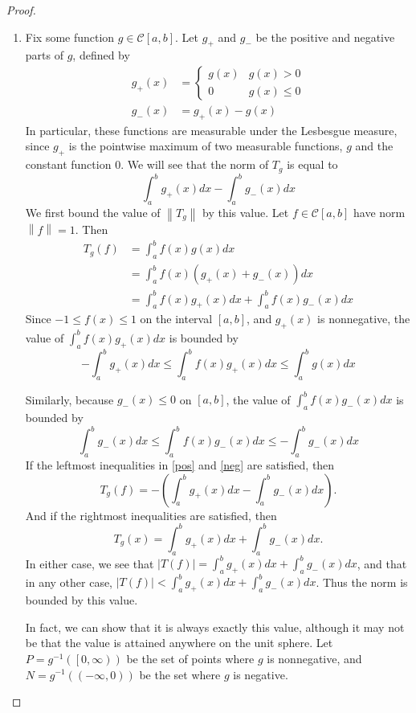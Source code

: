 \documentclass[12pt]{article}
\theoremstyle{definition}
\begin{document}
\begin{proof}
\begin{enumerate}[label=(\roman*)]
		\item Fix some function $g \in \mathcal{C}[a,b]$. Let $g_+$ and $g_-$ be the positive and negative parts of $g$, defined by 
			\begin{align*}g_+(x) &= \begin{cases}
					g(x) & g(x) > 0\\
					0 & g(x) \leq 0
			\end{cases}\\
		g_-(x) &= g_+(x) - g(x)  \end{align*}
		In particular, these functions are measurable under the Lesbesgue measure, since $g_+$ is the pointwise maximum of two measurable functions,  $g$ and the constant function $0$. We will see that the norm of $T_g$ is equal to 
		\[\int_a^b g_+(x) dx - \int_a^b g_-(x) dx\]
		We first bound the value of $\left \lVert { T_g } \right \lVert $ by this value. Let $f \in \mathcal{C}[a,b]$ have norm $\left \lVert { f } \right \lVert = 1$. Then 
		\begin{align*}
			T_g(f) &= \int_a^b f(x)g(x)dx\\
			&= \int_a^b f(x) (g_+(x) + g_-(x)) dx\\
			&= \int_a^b f(x)g_+(x)dx + \int_a^b f(x)g_-(x)dx
		\end{align*}
		Since $-1 \leq f(x) \leq 1$ on the interval $[a,b]$, and $g_+(x)$ is nonnegative, the value of $\int_a^bf(x)g_+(x) dx$ is bounded by 
		\begin{equation} -\int_a^b g_+(x)dx  \leq \int_a^b f(x)g_+(x) dx \leq \int_a^b g(x)dx \label{pos}\end{equation}
		\par Similarly, because $g_-(x) \leq 0$ on $[a,b]$, the value of $\int_a^b f(x)g_-(x)dx$ is bounded by
		\begin{equation} \int_a^b g_-(x)dx \leq \int_a^b f(x)g_-(x)dx \leq -\int_a^b g_-(x)dx\label{neg}\end{equation}
		If the leftmost inequalities in \ref{pos} and \ref{neg} are satisfied, then 
		\[ T_g(f) = -\left( \int_a^b g_+(x)dx - \int_a^b g_-(x)dx \right).\]
		And if the rightmost inequalities are satisfied, then
		\[ T_g(x) = \int_a^b g_+(x)dx + \int_a^b g_-(x)dx.\]
		In either case, we see that $\left \lvert { T(f) } \right \lvert = \int_a^b g_+(x)dx + \int_a^b g_-(x)dx$, and that in any other case, $\left \lvert { T(f) } \right \lvert < \int_a^b g_+(x)dx + \int_a^b g_-(x)dx$. Thus the norm is bounded by this value.
		\par In fact, we can show that it is always exactly this value, although it may not be that the value is attained anywhere on the unit sphere. Let $P = g^{-1}(\left[ 0, \infty \right))$ be the set of points where $g$ is nonnegative, and $N = g^{-1}( (-\infty, 0))$ be the set where $g$ is negative. 

\end{enumerate}
\end{proof}
\end{document}
